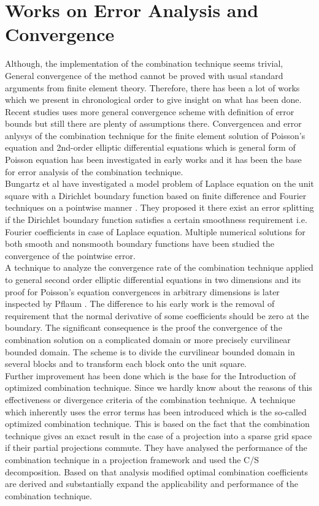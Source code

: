 \section{Works on Error Analysis and Convergence} 
Although, the implementation of the combination technique seems trivial, General convergence of the method cannot be proved with usual standard arguments from finite element theory. Therefore, there has been a lot of works which we present in chronological order to give insight on what has been done. Recent studies \cite{Reisinger2013} uses more general convergence scheme with definition of error bounds but still there are plenty of assumptions there.
Convergencea  and error anlysys of the combination technique for the finite element solution of Poisson's equation and 2nd-order elliptic differential equations which is general form of Poisson equation has been investigated in early works and it has been the base for error analysis of the combination technique.\cite{Pflaum1993, Pflaum1997}\\
Bungartz et al have investigated a model problem of Laplace equation on the unit square with a Dirichlet boundary function  based on finite difference and Fourier techniques on a pointwise manner \cite{Bungartz1994}. They proposed it there exist an error splitting if the Dirichlet boundary function satisfies a certain smoothness requirement i.e. Fourier coefficients in case of Laplace equation. Multiple numerical solutions for both smooth and nonsmooth boundary functions have been studied the convergence of the pointwise error.\cite{Bungartz1994}\\
A technique to analyze the convergence rate of the combination technique applied to general second order elliptic differential equations in two dimensions and its proof for Poisson's equation convergences in arbitrary dimensions is later inspected by Pflaum \cite{Pflaum1999}. The difference to his early work is the removal of requirement that the normal derivative of some coefficients should be zero at the boundary. The significant consequence is the proof the convergence of the combination solution on a complicated domain or more precisely curvilinear bounded domain. The scheme is to divide the curvilinear bounded domain in several blocks and to transform each block onto the unit square. \cite{Pflaum1999}\\
Further improvement has been done which is the base for the Introduction of optimized combination technique. Since we hardly know about the reasons of this effectiveness or divergence criteria of the combination technique. A technique which inherently uses the error terms has been introduced which is the so-called optimized combination technique. This is based on the fact that the combination technique gives an exact result in the case of a projection into a sparse grid space if their partial projections commute. They have analysed the performance of the combination technique in a projection framework and used the C/S decomposition. Based on that analysis modified optimal combination coefficients are derived and substantially expand the applicability and performance of the combination technique.\cite{Hegland2007}\\
